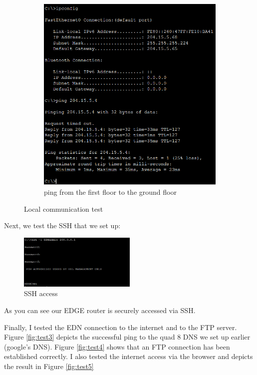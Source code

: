 \documentclass[ a4, 12pt, onecolumn]{IEEEtran}
\begin{document}
\begin{figure}[H]
\begin{subfigure}[b]{0.4\textwidth}
    \includegraphics[width=\textwidth]{comm2.png}
    \caption{ping from the first floor to the ground floor}
  \end{subfigure}
  \caption{Local communication test}
  \label{fig:test1}
\end{figure}
Next, we test the SSH that we set up:
\begin{figure}[H]
    \includegraphics[width=0.5\textwidth]{ssh.png}
    \caption{SSH access}
    \label{fig:test2}
\end{figure}
As you can see our EDGE router is securely accessed via SSH.
	
Finally, I tested the EDN connection to the internet and to the FTP server. Figure \ref{fig:test3} depicts the successful ping to the quad 8 DNS we set up earlier (google's DNS). Figure \ref{fig:test4} shows that an FTP connection has been established correctly. I also tested the internet access via the browser and depicts the result in Figure \ref{fig:test5} 
\end{document}

